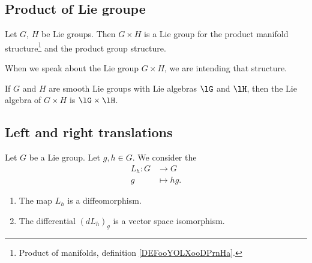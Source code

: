 \subsection{Product of Lie groupe}

\begin{propositionDef}      \label{PROPooKENCooMKJJjV}
	Let \( G\), \( H\) be Lie groups. Then \( G\times H\) is a Lie group for the product manifold structure\footnote{Product of manifolds, definition \ref{DEFooYOLXooDPrnHa}.} and the product group structure.

	When we speak about the Lie group \( G\times H\), we are intending that structure.
\end{propositionDef}

\begin{proposition}     \label{PROPooKITOooTcsIiu}
	If \( G\) and \( H\) are smooth Lie groups with Lie algebras \( \lG\) and \( \lH\), then the Lie algebra of \( G\times H\) is \( \lG\times \lH\).
\end{proposition}

\subsection{Left and right translations}

\begin{lemma}       \label{LEMooPIUFooHjyXln}
	Let \( G\) be a Lie group. Let \( g,h\in G\). We consider the 
	\begin{equation}
		\begin{aligned}
			L_h\colon G & \to G       \\
			g           & \mapsto hg.
		\end{aligned}
	\end{equation}
	\begin{enumerate}
		\item
		      The map \( L_h\) is a diffeomorphism.
		\item
		      The differential \( (dL_h)_g\) is a vector space isomorphism.
	\end{enumerate}
\end{lemma}

